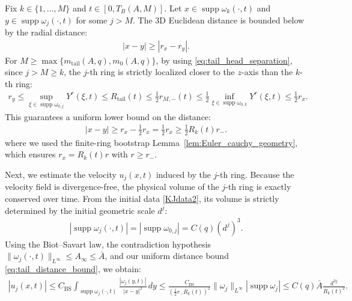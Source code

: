 \documentclass[reqno,11pt]{amsart}
\newcommand{\supp}{\operatorname{supp}}
\begin{document}
Fix $k \in \{1,\ldots,M\}$ and $t \in [0,T_B(A,M)]$. Let $x \in \supp \omega_k(\cdot,t)$ and $y \in \supp \omega_j(\cdot,t)$ for some $j > M$. The 3D Euclidean distance is bounded below by the radial distance:
\begin{align*}
    |x-y| \ge |r_x - r_y|.
\end{align*}
For $M\geq \max\{m_{\mathrm{tail}}(A,q), m_0(A,q)\} $, by using \eqref{eq:tail_head_separation}, since $j > M \ge k$, the $j$-th ring is strictly localized closer to the $z$-axis than the $k$-th ring:
\begin{align*}
    r_y 
    \le 
        \sup_{\xi \in \supp \omega_{0,j}} Y^r(\xi, t) 
    \le R_{\mathrm{tail}}(t) 
    \le \frac{1}{2} r_{M,-}(t)
    \le 
        \frac{1}{2} \inf_{\xi \in \supp \omega_{0,k}} Y^r(\xi, t) 
    \le \frac{1}{2} r_x.
\end{align*}
This guarantees a uniform lower bound on the distance:
\begin{align}
\label{eq:tail_distance_bound}
    |x-y| \ge r_x - \frac{1}{2} r_x = \frac{1}{2} r_x\geq \frac{1}{2} R_k(t) r_-.
\end{align}
where we used the finite-ring bootstrap Lemma~\ref{lem:Euler_cauchy_geometry}, which ensures $r_x = R_k(t) r$ with $r \ge r_-$. 

Next, we estimate the velocity $u_j(x,t)$ induced by the $j$-th ring. Because the velocity field is divergence-free, the physical volume of the $j$-th ring is exactly conserved over time. From the initial data \eqref{KJdata2}, its volume is strictly determined by the initial geometric scale $d^j$:
\begin{align*}
    |\supp \omega_j(\cdot, t)|
    = |\supp \omega_{0,j}|
= C(q) (d^j)^3 .
\end{align*}
Using the Biot--Savart law, the contradiction hypothesis $\|\omega_j(\cdot,t)\|_{L^\infty} \le A_\infty\le\bar A$, and our uniform distance bound \eqref{eq:tail_distance_bound}, we obtain:
\begin{align}
\label{eq:tail_uj_bound}
    |u_j(x,t)| 
    \le C_{\mathrm{BS}} \int_{\supp \omega_j(\cdot,t)} \frac{|\omega_j(y,t)|}{|x-y|^2} \, dy 
    \le \frac{C_{\mathrm{BS}}}{\left(\frac{1}{2} r_- R_k(t)\right)^2} \|\omega_j\|_{L^\infty} |\supp \omega_j|
    \le C(q) \bar A \frac{d^{3j}}{R_k(t)^2}.
\end{align}
\end{document}
